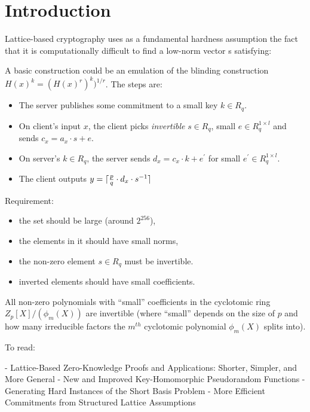 \section{Introduction}%
\label{sec:introduction}

Lattice-based cryptography uses as a fundamental hardness assumption the fact that it is computationally difficult to find a low-norm vector s satisfying:

A basic construction could be an emulation of the blinding construction $H(x)^{k} = (H(x) ^{r})^{k}) ^ {1/r}$.
The steps are:

\begin{itemize}
  \item The server publishes some commitment to a small key $k \in R_q$.
  \item On client's input $x$, the client picks \emph{invertible} $s \in R_q$, small $e \in R^{1 \times l}_q$ and sends $c_x = a_x \cdot s + e$.
  \item On server's $k \in R_q$, the server sends $d_x = c_x \cdot k + e^{\prime}$ for small $e^{\prime} \in R^{1 \times l}_q$.
  \item The client outputs $y = \lceil {p \over q} \cdot d_x \cdot s^{-1} \rceil$
\end{itemize}

Requirement:

\begin{itemize}
  \item the set should be large (around $2^{256}$),
  \item the elements in it should have small norms,
  \item the non-zero element $s \in R_q$ must be invertible.
  \item inverted elements should have small coefficients.
\end{itemize}

All non-zero polynomials with ``small'' coefficients in the cyclotomic ring $Z_p[X]/(\phi_m(X))$ are invertible (where ``small'' depends on the size of $p$ and how many irreducible factors the $m^{th}$ cyclotomic polynomial $\phi_m(X)$ splits into).

To read:

- Lattice-Based Zero-Knowledge Proofs and Applications: Shorter, Simpler, and More General
- New and Improved Key-Homomorphic Pseudorandom Functions
- Generating Hard Instances of the Short Basis Problem
- More Efficient Commitments from Structured Lattice Assumptions

